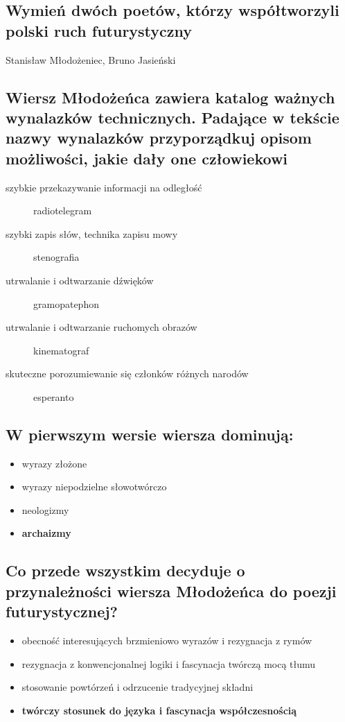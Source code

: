 \documentclass[a4paper]{article}
\begin{document}
\subsection{Wymień dwóch poetów, którzy współtworzyli polski ruch futurystyczny}
Stanisław Młodożeniec, Bruno Jasieński
\subsection{Wiersz Młodożeńca zawiera katalog ważnych wynalaz\-ków technicznych. Padające w tekście nazwy wynalaz\-ków przyporządkuj opisom możliwości, jakie dały one człowie\-kowi}
\begin{description}
    \item[szybkie przekazywanie informacji na odległość] radiotelegram
    \item[szybki zapis słów, technika zapisu mowy] stenografia
    \item[utrwalanie i odtwarzanie dźwięków] gramopatephon
    \item[utrwalanie i odtwarzanie ruchomych obrazów] kinematograf
    \item[skuteczne porozumiewanie się członków różnych narodów] esperanto
\end{description}
\subsection{W pierwszym wersie wiersza dominują:}
\begin{itemize}
    \item wyrazy złożone
    \item wyrazy niepodzielne słowotwórczo
    \item neologizmy
    \item \textbf{archaizmy}
\end{itemize}
\subsection{Co przede wszystkim decyduje o przynależności wiersza Młodożeńca do poezji futurystycznej?}
\begin{itemize}
    \item obecność interesujących brzmieniowo wyrazów i rezygnacja z rymów
    \item rezygnacja z konwencjonalnej logiki i fascynacja twórczą mocą tłumu
    \item stosowanie powtórzeń i odrzucenie tradycyjnej składni
    \item \textbf{twórczy stosunek do języka i fascynacja współczesnością}
\end{itemize}
\end{document}
